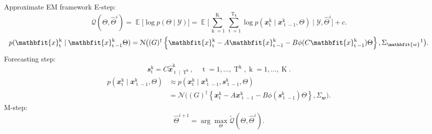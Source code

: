 \documentclass[mathserif,11pt]{beamer}
\DeclareMathOperator{\E}{\mathbb{E}}
\DeclareMathOperator{\td}{\mathrm{t}}
\DeclareMathOperator{\kd}{\mathrm{k}}
\DeclareMathOperator{\T}{\mathrm{T}}
\DeclareMathOperator{\K}{\mathrm{K}}
\begin{document}
\begin{frame}{Approximate EM framework}
E-step:
\vspace{-0.5cm}
\begin{equation*}
\mathcal{Q}(\Theta, \hat{\Theta}^i) = \E \big[\log p(\Theta \mid \mathcal{Y}) \big] = \E \Big[ \sum_{\kd=1}^{\K} \sum_{\td=1}^{\T_{\kd}}\log p(\mathbfit{x}_{\td}^{\kd} \mid \mathbfit{x}_{\td-1}^{\kd}, \Theta) \mid \mathcal{Y}, \hat{\Theta}^{i} \Big] + c.
\end{equation*}
\vspace{-0.2cm}
\begin{equation*}
p(\mathbfit{x}_{\td}^{\kd} \mid \mathbfit{x}_{\td-1}^{\kd} \Theta) = \mathcal{N}\big((G)^\dag \left\lbrace  \mathbfit{x}_{\td}^{\kd}- A\mathbfit{x}_{\td-1}^{\kd}- B\phi(C\mathbfit{x}_{\td-1}^{\kd}) \Theta\right\rbrace , \Sigma_{\mathbfit{w}}\footnote{\scriptsize{$\Sigma_{\mathbfit{w}} \triangleq \big\{(G)^\dag \big\}^\top (Q_{\omega})^{-1} (G)^\dag$}}\big).
\end{equation*}
\vfil
Forecasting step:
\vspace{-0.2cm}
\begin{equation*}
\mathbfit{s}_{\td}^{\kd} = C \hat{\mathbfit{x}}_{\td \mid \T^{\kd}}^{\kd}, \quad \td = 1, \dots, \T^{\kd}, \kd = 1, \dots, \K.
\end{equation*} 
\vspace{-0.4cm}
\begin{equation*}
\begin{split}
p(\mathbfit{x}_{\td}^{\kd} \mid \mathbfit{x}_{\td-1}^{\kd}, \Theta) &\approx p(\mathbfit{x}_{\td}^{\kd} \mid \mathbfit{x}_{\td-1}^{\kd}, \mathbfit{s}_{\td-1}^{\kd}, \Theta)\\ &=   \mathcal{N}\big((G)^\dag\left\lbrace  \mathbfit{x}_{\td}^{\kd}- A\mathbfit{x}_{\td-1}^{\kd}- B\phi(\mathbfit{s}_{\td-1}^{\kd}) \Theta\right\rbrace, \Sigma_{\mathbfit{w}}\big).
\end{split}
\end{equation*}
M-step:\\
\vspace{-0.5cm}
\begin{equation*}
\hat{\Theta}^{i+1} = \arg \underset{\Theta}{\max} \tilde{\mathcal{Q}}(\Theta, \hat{\Theta}^i).
\end{equation*}
\end{frame}
\end{document}
